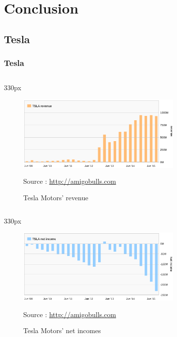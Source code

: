     \section{Conclusion}

\subsection{Tesla}
\begin{frame}
\frametitle{Tesla}
\begin{center}
\begin{columns}
\begin{column}{330px}
{
    \begin{figure}[h!]
        \centering
        \includegraphics[width=310px]
            {images/TSLA-revenue-chart.eps}
        \vspace{-1em}
        \caption{Tesla Motors' revenue}
        \scriptsize{Source :
            \url{http://amigobulls.com}}
    \end{figure}
}
\end{column}
\end{columns}
\end{center}
\end{frame}


\begin{frame}
\begin{center}
\begin{columns}
\begin{column}{330px}
{
    \begin{figure}[h!]
        \centering
        \includegraphics[width=310px]
            {images/TSLA-netincome-chart.eps}
        \vspace{-1em}
        \caption{Tesla Motors' net incomes}
        \scriptsize{Source :
            \url{http://amigobulls.com}}
    \end{figure}
}
\end{column}
\end{columns}
\end{center}
\end{frame}


